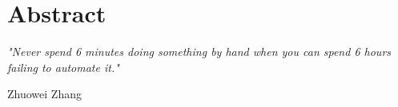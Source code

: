 \hypertarget{abstract}{%
	\section*{Abstract}\label{abstract}}



\newpage

\emph{"Never spend 6 minutes doing something by hand when you can spend 6 hours failing to automate it."}

Zhuowei Zhang